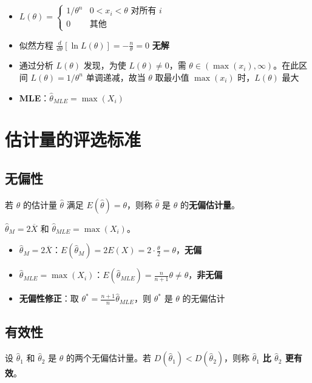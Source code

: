 \begin{example}
\begin{itemize}
	\item $L(\theta) = \begin{cases} 1/\theta^n & 0 < x_i < \theta \text{ 对所有 } i \\ 0 & \text{其他} \end{cases}$
	\item 似然方程 $\frac{d}{d\theta}[\ln L(\theta)] = -\frac{n}{\theta} = 0$ \textbf{无解}
	\item 通过分析 $L(\theta)$ 发现，为使 $L(\theta) \neq 0$，需 $\theta \in (\max(x_i), \infty)$。在此区间 $L(\theta)=1/\theta^n$ 单调递减，故当 $\theta$ 取最小值 $\max(x_i)$ 时，$L(\theta)$ 最大
	\item \textbf{MLE}：$\hat{\theta}_{MLE} = \max(X_i)$
\end{itemize}
\end{example}

\section{估计量的评选标准}
\subsection{无偏性}
\begin{definition}[无偏性]
若 $\theta$ 的估计量 $\hat{\theta}$ 满足 $E(\hat{\theta}) = \theta$，则称 $\hat{\theta}$ 是 $\theta$ 的\textbf{无偏估计量}。
\end{definition}

\begin{example}
$\hat{\theta}_M = 2\overline{X}$ 和 $\hat{\theta}_{MLE} = \max(X_i)$。
\begin{itemize}
	\item \textbf{$\hat{\theta}_M = 2\overline{X}$}：$E(\hat{\theta}_M) = 2E(X) = 2 \cdot \frac{\theta}{2} = \theta$，\textbf{无偏}
	\item \textbf{$\hat{\theta}_{MLE} = \max(X_i)$}：$E(\hat{\theta}_{MLE}) = \frac{n}{n+1}\theta \neq \theta$，\textbf{非无偏}
	\item \textbf{无偏性修正}：取 $\theta^* = \frac{n+1}{n}\hat{\theta}_{MLE}$，则 $\theta^*$ 是 $\theta$ 的无偏估计
\end{itemize}
\end{example}

\subsection{有效性}
\begin{definition}[有效性]
设 $\hat{\theta}_1$ 和 $\hat{\theta}_2$ 是 $\theta$ 的两个无偏估计量。若 $D(\hat{\theta}_1) < D(\hat{\theta}_2)$，则称 $\hat{\theta}_1$ \textbf{比 $\hat{\theta}_2$ 更有效}。
\end{definition}

